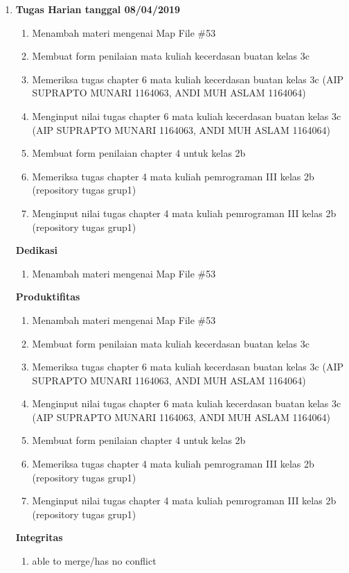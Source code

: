 \begin{enumerate}
\item \textbf{Tugas Harian tanggal 08/04/2019}
\begin{enumerate}
\item Menambah materi mengenai Map File \#53
\item Membuat form penilaian mata kuliah kecerdasan buatan kelas 3c
\item Memeriksa tugas chapter 6 mata kuliah kecerdasan buatan kelas 3c (AIP SUPRAPTO MUNARI 1164063, ANDI MUH ASLAM 1164064)
\item Menginput nilai tugas chapter 6 mata kuliah kecerdasan buatan kelas 3c (AIP SUPRAPTO MUNARI 1164063, ANDI MUH ASLAM 1164064)
\item Membuat form penilaian chapter 4 untuk kelas 2b
\item Memeriksa tugas chapter 4 mata kuliah pemrograman III kelas 2b (repository tugas grup1)
\item Menginput nilai tugas chapter 4 mata kuliah pemrograman III kelas 2b (repository tugas grup1)
\end{enumerate}

\textbf{Dedikasi}
\begin{enumerate}
\item Menambah materi mengenai Map File \#53
\end{enumerate}

\textbf{Produktifitas}
\begin{enumerate}
\item Menambah materi mengenai Map File \#53
\item Membuat form penilaian mata kuliah kecerdasan buatan kelas 3c
\item Memeriksa tugas chapter 6 mata kuliah kecerdasan buatan kelas 3c (AIP SUPRAPTO MUNARI 1164063, ANDI MUH ASLAM 1164064)
\item Menginput nilai tugas chapter 6 mata kuliah kecerdasan buatan kelas 3c (AIP SUPRAPTO MUNARI 1164063, ANDI MUH ASLAM 1164064)
\item Membuat form penilaian chapter 4 untuk kelas 2b
\item Memeriksa tugas chapter 4 mata kuliah pemrograman III kelas 2b (repository tugas grup1)
\item Menginput nilai tugas chapter 4 mata kuliah pemrograman III kelas 2b (repository tugas grup1)
\end{enumerate}

\textbf{Integritas}
\begin{enumerate}
\item able to merge/has no conflict
\end{enumerate}


\end{enumerate}
